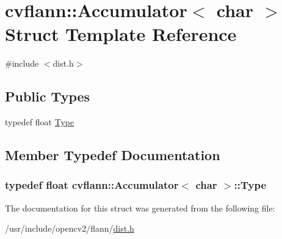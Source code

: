 \hypertarget{structcvflann_1_1Accumulator_3_01char_01_4}{\section{cvflann\-:\-:Accumulator$<$ char $>$ Struct Template Reference}
\label{structcvflann_1_1Accumulator_3_01char_01_4}
}


{\ttfamily \#include $<$dist.\-h$>$}

\subsection*{Public Types}
\begin{DoxyCompactItemize}
\item 
typedef float \hyperlink{structcvflann_1_1Accumulator_3_01char_01_4_a7aafbff14621fbe63e78b863c4b7041b}{Type}
\end{DoxyCompactItemize}


\subsection{Member Typedef Documentation}
\hypertarget{structcvflann_1_1Accumulator_3_01char_01_4_a7aafbff14621fbe63e78b863c4b7041b}{
\subsubsection[{Type}]{\setlength{\rightskip}{0pt plus 5cm}typedef float {\bf cvflann\-::\-Accumulator}$<$ char $>$\-::{\bf Type}}}\label{structcvflann_1_1Accumulator_3_01char_01_4_a7aafbff14621fbe63e78b863c4b7041b}


The documentation for this struct was generated from the following file\-:\begin{DoxyCompactItemize}
\item 
/usr/include/opencv2/flann/\hyperlink{dist_8h}{dist.\-h}\end{DoxyCompactItemize}
